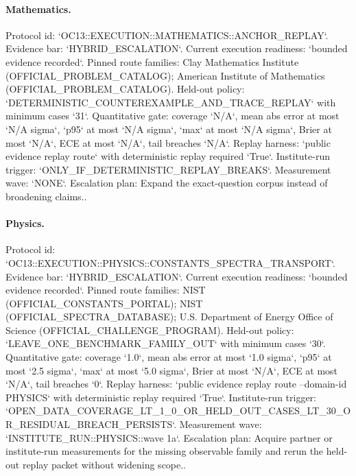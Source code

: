 \paragraph{Mathematics.}
Protocol id: `OC13::EXECUTION::MATHEMATICS::ANCHOR\_REPLAY`. Evidence bar: `HYBRID\_ESCALATION`. Current execution readiness: `bounded evidence recorded`.
Pinned route families: Clay Mathematics Institute (OFFICIAL\_PROBLEM\_CATALOG); American Institute of Mathematics (OFFICIAL\_PROBLEM\_CATALOG).
Held-out policy: `DETERMINISTIC\_COUNTEREXAMPLE\_AND\_TRACE\_REPLAY` with minimum cases `31`.
Quantitative gate: coverage `N/A`, mean abs error at most `N/A sigma`, `p95` at most `N/A sigma`, `max` at most `N/A sigma`, Brier at most `N/A`, ECE at most `N/A`, tail breaches `N/A`.
Replay harness: `public evidence replay route` with deterministic replay required `True`.
Institute-run trigger: `ONLY\_IF\_DETERMINISTIC\_REPLAY\_BREAKS`. Measurement wave: `NONE`.
Escalation plan: Expand the exact-question corpus instead of broadening claims..

\paragraph{Physics.}
Protocol id: `OC13::EXECUTION::PHYSICS::CONSTANTS\_SPECTRA\_TRANSPORT`. Evidence bar: `HYBRID\_ESCALATION`. Current execution readiness: `bounded evidence recorded`.
Pinned route families: NIST (OFFICIAL\_CONSTANTS\_PORTAL); NIST (OFFICIAL\_SPECTRA\_DATABASE); U.S. Department of Energy Office of Science (OFFICIAL\_CHALLENGE\_PROGRAM).
Held-out policy: `LEAVE\_ONE\_BENCHMARK\_FAMILY\_OUT` with minimum cases `30`.
Quantitative gate: coverage `1.0`, mean abs error at most `1.0 sigma`, `p95` at most `2.5 sigma`, `max` at most `5.0 sigma`, Brier at most `N/A`, ECE at most `N/A`, tail breaches `0`.
Replay harness: `public evidence replay route --domain-id PHYSICS` with deterministic replay required `True`.
Institute-run trigger: `OPEN\_DATA\_COVERAGE\_LT\_1\_0\_OR\_HELD\_OUT\_CASES\_LT\_30\_OR\_RESIDUAL\_BREACH\_PERSISTS`. Measurement wave: `INSTITUTE\_RUN::PHYSICS::wave 1a`.
Escalation plan: Acquire partner or institute-run measurements for the missing observable family and rerun the held-out replay packet without widening scope..

